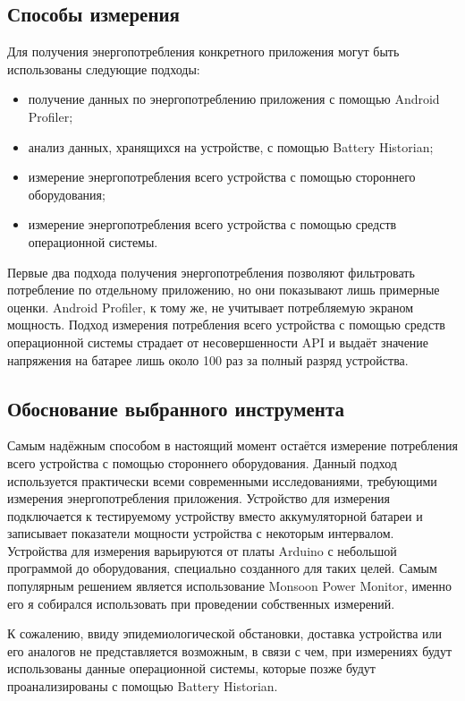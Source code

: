 \documentclass[a4paper,14pt]{extarticle} %
\begin{document}
	\subsection{Способы измерения}
	
	Для получения энергопотребления конкретного приложения могут быть использованы следующие подходы:
	\begin{itemize}
		\item получение данных по энергопотреблению приложения с помощью Android Profiler;
		\item анализ данных, хранящихся на устройстве, с помощью Battery Historian;
		\item измерение энергопотребления всего устройства с помощью стороннего оборудования;
		\item измерение энергопотребления всего устройства с помощью средств операционной системы.
	\end{itemize}
	
	Первые два подхода получения энергопотребления позволяют фильтровать потребление по отдельному приложению, но они показывают лишь примерные оценки. Android Profiler, к тому же, не учитывает потребляемую экраном мощность. Подход измерения потребления всего устройства с помощью средств операционной системы страдает от несовершенности API и выдаёт значение напряжения на батарее лишь около 100 раз за полный разряд устройства.
	
	\subsection{Обоснование выбранного инструмента}
	
	Самым надёжным способом в настоящий момент остаётся измерение потребления всего устройства с помощью стороннего оборудования. Данный подход используется практически всеми современными исследованиями, требующими измерения энергопотребления приложения. Устройство для измерения подключается к тестируемому устройству вместо аккумуляторной батареи и записывает показатели мощности устройства с некоторым интервалом. Устройства для измерения варьируются от платы Arduino с небольшой программой до оборудования, специально созданного для таких целей. Самым популярным решением является использование Monsoon Power Monitor, именно его я собирался использовать при проведении собственных измерений. 
	
	К сожалению, ввиду эпидемиологической обстановки, доставка устройства или его аналогов не представляется возможным, в связи с чем, при измерениях будут использованы данные операционной системы, которые позже будут проанализированы с помощью Battery Historian.
	
\end{document}
